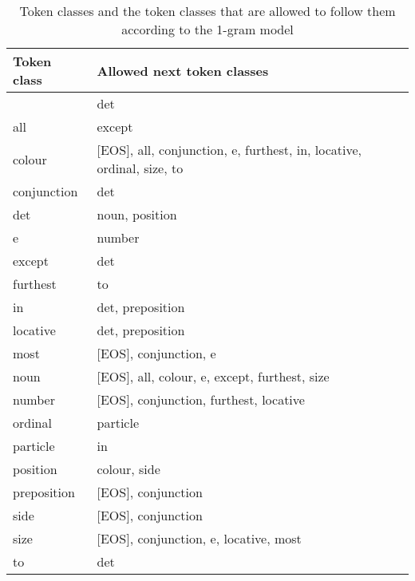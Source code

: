 \begin{table}[h]
  \centering
  \begin{tabular}{|l|p{5cm}|}
    \hline
    \textbf{Token class} & \textbf{Allowed next token classes} \\ \hline
    [SEP] & det \\ \hline
    all & except \\ \hline
    colour & [EOS], all, conjunction, e, furthest, in, locative, ordinal, size, to \\ \hline
    conjunction & det \\ \hline
    det & noun, position \\ \hline
    e & number \\ \hline
    except & det \\ \hline
    furthest & to \\ \hline
    in & det, preposition \\ \hline
    locative & det, preposition \\ \hline
    most & [EOS], conjunction, e \\ \hline
    noun & [EOS], all, colour, e, except, furthest, size \\ \hline
    number & [EOS], conjunction, furthest, locative \\ \hline
    ordinal & particle \\ \hline
    particle & in \\ \hline
    position & colour, side \\ \hline
    preposition & [EOS], conjunction \\ \hline
    side & [EOS], conjunction \\ \hline
    size & [EOS], conjunction, e, locative, most \\ \hline
    to & det \\ \hline
  \end{tabular}
  \caption{Token classes and the token classes that are allowed to follow them according to the 1-gram model}
  \label{tab:token_links}
\end{table}
